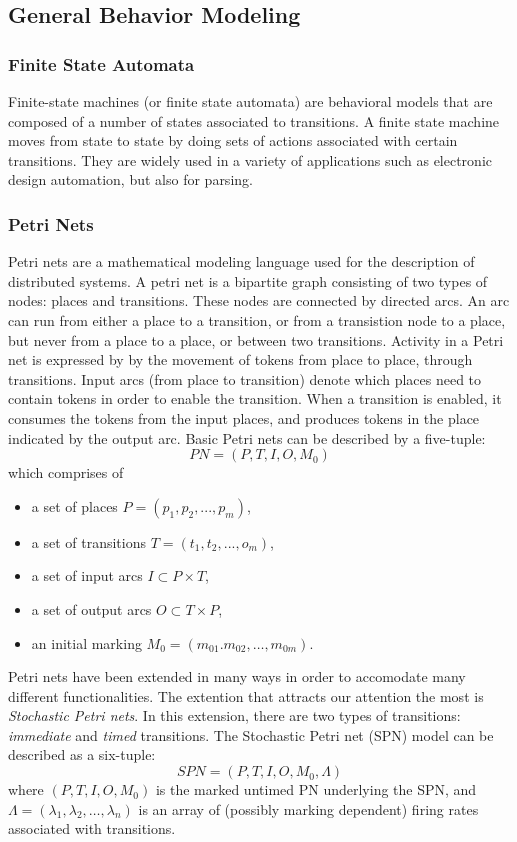 \documentclass[11pt]{article}
\begin{document}
\subsection{General Behavior Modeling}
\subsubsection{Finite State Automata}
Finite-state machines (or finite state automata) are behavioral models that are composed of a number of states associated to transitions. A finite state machine moves from state to state by doing sets of actions associated with certain transitions. They are widely used in a variety of applications such as electronic design automation, but also for parsing.


\subsubsection{Petri Nets}
Petri nets are a mathematical modeling language used for the description of distributed systems. A petri net is a bipartite graph consisting of two types of nodes: places and transitions. These nodes are connected by directed arcs. An arc can run from either a place to a transition, or from a transistion node to a place, but never from a place to a place, or between two transitions. Activity in a Petri net is expressed by by the movement of tokens from place to place, through transitions. Input arcs (from place to transition) denote which places need to contain tokens in order to enable the transition. When a transition is enabled, it consumes the tokens from the input places, and produces tokens in the place indicated by the output arc.
Basic Petri nets can be described by a five-tuple:
\begin{equation}
PN = (P,T,I,O,M_0)
\end{equation}
which comprises of
\begin{itemize}
\item a set of places $P = (p_1, p_2, ..., p_m)$,
\item a set of transitions $T = (t_1, t_2, ...,o_m)$,
\item a set of input arcs $I \subset P \times T$,
\item a set of output arcs $O \subset T \times P$,
\item an initial marking $M_0 = (m_{01}. m_{02}, \ldots, m_{0m})$.

\end{itemize}

Petri nets have been extended in many ways in order to accomodate many different functionalities. The extention that attracts our attention the most is \emph{Stochastic Petri nets}. In this extension, there are two types of transitions: \emph{immediate} and \emph{timed} transitions.
The Stochastic Petri net (SPN) model can be described as a six-tuple:
\begin{equation}
SPN = (P,T,I,O,M_0,\Lambda)
\end{equation}
where $(P,T,I,O,M_0)$ is the marked untimed PN underlying the SPN, and $\Lambda = (\lambda_1, \lambda_2, \ldots, \lambda_n)$ is an array of (possibly marking dependent) firing rates associated with transitions.
\end{document}
